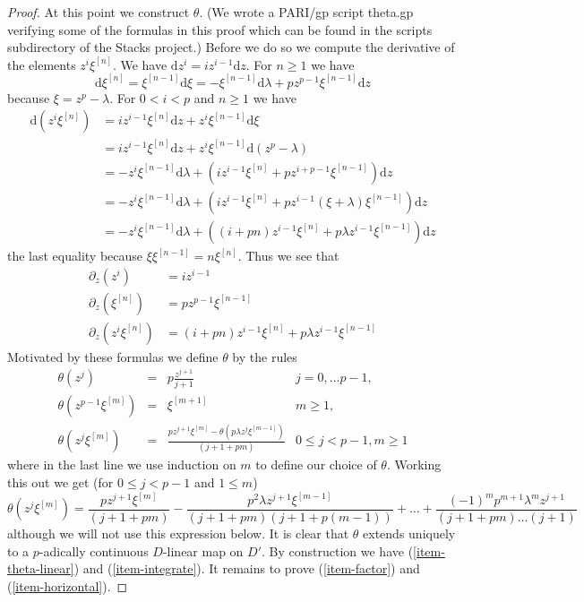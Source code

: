 \documentclass{stacks-project}
\theoremstyle{plain}
\theoremstyle{definition}
\theoremstyle{remark}
\numberwithin{equation}{subsection}
\begin{document}
\begin{proof}
\medskip\noindent
At this point we construct $\theta$. (We wrote a PARI/gp script theta.gp
verifying some of the formulas in this proof which can be found in the
scripts subdirectory of the Stacks project.) Before we do so we compute
the derivative of the elements $z^i \xi^{[n]}$. We have
$\text{d}z^i = i z^{i - 1} \text{d}z$. For $n \geq 1$ we have
$$
\text{d}\xi^{[n]} =
\xi^{[n - 1]} \text{d}\xi =
- \xi^{[n - 1]}\text{d}\lambda + p z^{p - 1} \xi^{[n - 1]}\text{d}z
$$
because $\xi = z^p - \lambda$. For $0 < i < p$ and $n \geq 1$ we have
\begin{align*}
\text{d}(z^i\xi^{[n]})
& =
iz^{i - 1}\xi^{[n]}\text{d}z + z^i\xi^{[n - 1]}\text{d}\xi \\
& =
iz^{i - 1}\xi^{[n]}\text{d}z + z^i\xi^{[n - 1]}\text{d}(z^p - \lambda) \\
& =
- z^i\xi^{[n - 1]}\text{d}\lambda +
(iz^{i - 1}\xi^{[n]} + pz^{i + p - 1}\xi^{[n - 1]})\text{d}z \\
& =
- z^i\xi^{[n - 1]}\text{d}\lambda +
(iz^{i - 1}\xi^{[n]} + pz^{i - 1}(\xi + \lambda)\xi^{[n - 1]})\text{d}z \\
& =
- z^i\xi^{[n - 1]}\text{d}\lambda +
((i + pn)z^{i - 1}\xi^{[n]} + p\lambda z^{i - 1}\xi^{[n - 1]})\text{d}z
\end{align*}
the last equality because $\xi \xi^{[n - 1]} = n\xi^{[n]}$.
Thus we see that
\begin{align*}
\partial_z(z^i) & = i z^{i - 1} \\
\partial_z(\xi^{[n]}) & = p z^{p - 1} \xi^{[n - 1]} \\
\partial_z(z^i\xi^{[n]}) & =
(i + pn) z^{i - 1} \xi^{[n]} + p \lambda z^{i - 1}\xi^{[n - 1]}
\end{align*}
Motivated by these formulas we define $\theta$ by the rules
$$
\begin{matrix}
\theta(z^j)
& = & p\frac{z^{j + 1}}{j + 1}
& j = 0, \ldots p - 1, \\
\theta(z^{p - 1}\xi^{[m]})
& = & \xi^{[m + 1]}
& m \geq 1, \\
\theta(z^j \xi^{[m]})
& = &
\frac{p z^{j + 1} \xi^{[m]} - \theta(p\lambda z^j \xi^{[m - 1]})}{(j + 1 + pm)}
& 0 \leq j < p - 1, m \geq 1
\end{matrix}
$$
where in the last line we use induction on $m$ to define our choice of
$\theta$. Working this out we get (for $0 \leq j < p - 1$ and $1 \leq m$)
$$
\theta(z^j \xi^{[m]}) =
\textstyle{\frac{p z^{j + 1} \xi^{[m]}}{(j + 1 + pm)} -
\frac{p^2 \lambda z^{j + 1} \xi^{[m - 1]}}{(j + 1 + pm)(j + 1 + p(m - 1))} +
\ldots +
\frac{(-1)^m p^{m + 1} \lambda^m z^{j + 1}}
{(j + 1 + pm) \ldots (j + 1)}}
$$
although we will not use this expression below. It is clear that $\theta$
extends uniquely to a $p$-adically continuous $D$-linear map on $D'$.
By construction we have (\ref{item-theta-linear}) and (\ref{item-integrate}).
It remains to prove (\ref{item-factor}) and (\ref{item-horizontal}).


\end{proof}
\end{document}

